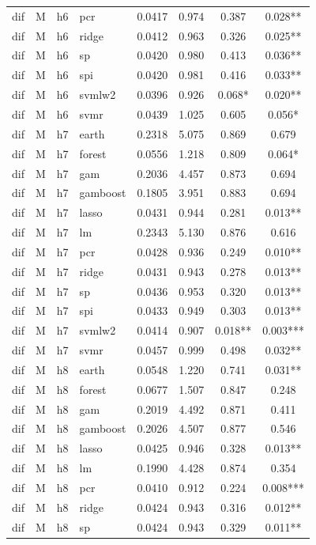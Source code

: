 \begin{ThreePartTable}
\begin{longtable}[t]{llclcccc}
dif & M & h6 & pcr & 0.0417 & 0.974 & 0.387 & 0.028**\\
dif & M & h6 & ridge & 0.0412 & 0.963 & 0.326 & 0.025**\\
dif & M & h6 & sp & 0.0420 & 0.980 & 0.413 & 0.036**\\
dif & M & h6 & spi & 0.0420 & 0.981 & 0.416 & 0.033**\\
dif & M & h6 & svmlw2 & 0.0396 & 0.926 & 0.068* & 0.020**\\
dif & M & h6 & svmr & 0.0439 & 1.025 & 0.605 & 0.056*\\
\addlinespace
dif & M & h7 & earth & 0.2318 & 5.075 & 0.869 & 0.679\\
dif & M & h7 & forest & 0.0556 & 1.218 & 0.809 & 0.064*\\
dif & M & h7 & gam & 0.2036 & 4.457 & 0.873 & 0.694\\
dif & M & h7 & gamboost & 0.1805 & 3.951 & 0.883 & 0.694\\
dif & M & h7 & lasso & 0.0431 & 0.944 & 0.281 & 0.013**\\
dif & M & h7 & lm & 0.2343 & 5.130 & 0.876 & 0.616\\
dif & M & h7 & pcr & 0.0428 & 0.936 & 0.249 & 0.010**\\
dif & M & h7 & ridge & 0.0431 & 0.943 & 0.278 & 0.013**\\
dif & M & h7 & sp & 0.0436 & 0.953 & 0.320 & 0.013**\\
dif & M & h7 & spi & 0.0433 & 0.949 & 0.303 & 0.013**\\
dif & M & h7 & svmlw2 & 0.0414 & 0.907 & 0.018** & 0.003***\\
dif & M & h7 & svmr & 0.0457 & 0.999 & 0.498 & 0.032**\\
\addlinespace
dif & M & h8 & earth & 0.0548 & 1.220 & 0.741 & 0.031**\\
dif & M & h8 & forest & 0.0677 & 1.507 & 0.847 & 0.248\\
dif & M & h8 & gam & 0.2019 & 4.492 & 0.871 & 0.411\\
dif & M & h8 & gamboost & 0.2026 & 4.507 & 0.877 & 0.546\\
dif & M & h8 & lasso & 0.0425 & 0.946 & 0.328 & 0.013**\\
dif & M & h8 & lm & 0.1990 & 4.428 & 0.874 & 0.354\\
dif & M & h8 & pcr & 0.0410 & 0.912 & 0.224 & 0.008***\\
dif & M & h8 & ridge & 0.0424 & 0.943 & 0.316 & 0.012**\\
dif & M & h8 & sp & 0.0424 & 0.943 & 0.329 & 0.011**\\

\end{longtable}
\end{ThreePartTable}
